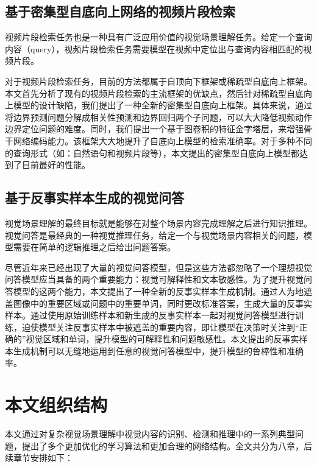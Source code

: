 \subsection{基于密集型自底向上网络的视频片段检索}

视频片段检索任务也是一种具有广泛应用价值的视觉场景理解任务。给定一个查询内容（query），视频片段检索任务需要模型在视频中定位出与查询内容相匹配的视频片段。

对于视频片段检索任务，目前的方法都属于自顶向下框架或稀疏型自底向上框架。本文首先分析了现有的视频片段检索的主流框架的优缺点，然后针对稀疏型自底向上模型的设计缺陷，我们提出了一种全新的密集型自底向上框架。具体来说，通过将边界预测问题分解成相关性预测和边界回归两个子问题，可以大大降低视频动作边界定位问题的难度。同时，我们提出一个基于图卷积的特征金字塔层，来增强骨干网络编码能力。该框架大大地提升了自底向上模型的检索准确率。对于多种不同的查询形式（如：自然语句和视频片段等），本文提出的密集型自底向上模型都达到了目前最好的性能。


\subsection{基于反事实样本生成的视觉问答}

视觉场景理解的最终目标就是能够在对整个场景内容完成理解之后进行知识推理。视觉问答是最经典的一种视觉推理任务，给定一个与视觉场景内容相关的问题，模型需要在简单的逻辑推理之后给出问题答案。

尽管近年来已经出现了大量的视觉问答模型，但是这些方法都忽略了一个理想视觉问答模型应当具备的两个重要能力：视觉可解释性和文本敏感性。为了提升视觉问答模型的这两个能力，本文提出了一种全新的反事实样本生成机制。通过人为地遮盖图像中的重要区域或问题中的重要单词，同时更改标准答案，生成大量的反事实样本。通过使用原始训练样本和新生成的反事实样本一起对视觉问答模型进行训练，迫使模型关注反事实样本中被遮盖的重要内容，即让模型在决策时关注到“正确的”视觉区域和单词，提升模型的可解释性和问题敏感性。本文提出的反事实样本生成机制可以无缝地运用到任意的视觉问答模型中，提升模型的鲁棒性和准确率。


\section{本文组织结构}
本文通过对复杂视觉场景理解中视觉内容的识别、检测和推理中的一系列典型问题，提出了多个更加优化的学习算法和更加合理的网络结构。全文共分为八章，后续章节安排如下：

